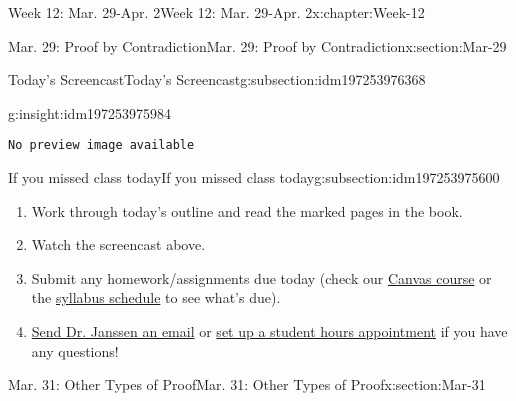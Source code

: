 \documentclass[oneside,10pt,]{book}
\newcommand{\mono}[1]{\texttt{#1}}
\numberwithin{equation}{section}
\newlength{\qrsize}
\newlength{\previewwidth}
\begin{document}
\begin{chapterptx}{Week 12: Mar. 29-Apr. 2}{}{Week 12: Mar. 29-Apr. 2}{}{}{x:chapter:Week-12}
\begin{sectionptx}{Mar. 29: Proof by Contradiction}{}{Mar. 29: Proof by Contradiction}{}{}{x:section:Mar-29}
\typeout{************************************************}
%
\begin{subsectionptx}{Today's Screencast}{}{Today's Screencast}{}{}{g:subsection:idm197253976368}
\begin{insight}{}{g:insight:idm197253975984}%
\setlength{\qrsize}{9em}
\setlength{\previewwidth}{\linewidth}
\addtolength{\previewwidth}{-\qrsize}
\begin{tcbraster}[raster columns=2, raster column skip=1pt, raster halign=center, raster force size=false, raster left skip=0pt, raster right skip=0pt]%
\begin{tcolorbox}[previewstyle, width=\previewwidth]%
\mono{No preview image available}%
\end{tcolorbox}%
\begin{tcolorbox}[qrstyle]%
[QR LINK]\end{tcolorbox}%
\end{tcbraster}%
\end{insight}
\end{subsectionptx}
%
%
\typeout{************************************************}
\typeout{************************************************}
%
\begin{subsectionptx}{If you missed class today}{}{If you missed class today}{}{}{g:subsection:idm197253975600}
%
\begin{enumerate}
\item{}Work through today's outline and read the marked pages in the book.%
\item{}Watch the screencast above.%
\item{}Submit any homework\slash{}assignments due today (check our \href{https://dordt.instructure.com/courses/3110050}{Canvas course} or the \href{https://prof.mkjanssen.org/ds/index.html\#schedule}{syllabus schedule} to see what's due).%
\item{}\href{mailto:mike.janssen@dordt.edu}{Send Dr. Janssen an email} or \href{https://calendly.com/mkjanssen/student-hours}{set up a student hours appointment} if you have any questions!%
\end{enumerate}
\end{subsectionptx}
\end{sectionptx}
%
%
\typeout{************************************************}
\typeout{************************************************}
%
\begin{sectionptx}{Mar. 31: Other Types of Proof}{}{Mar. 31: Other Types of Proof}{}{}{x:section:Mar-31}

\end{sectionptx}
\end{chapterptx}
\end{document}
